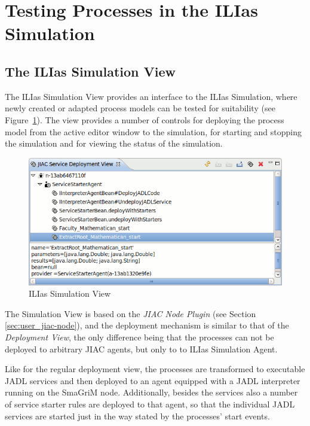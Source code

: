 \section{Testing Processes in the ILIas Simulation}


\subsection{The ILIas Simulation View}

The ILIas Simulation View provides an interface to the ILIas Simulation, where
newly created or adapted process models can be tested for suitability (see
Figure~\ref{fig:ilias-simview}).  The view provides a number of controls for
deploying the process model from the active editor window to the simulation, for
starting and stopping the simulation and for viewing the status of the simulation.

\begin{figure}[ht]
	\centering
	\includegraphics[width=.6\textwidth]{figures/features/deployment-view.png}
	\caption{ILIas Simulation View}
	\label{fig:ilias-simview}
\end{figure}

The Simulation View is based on the \emph{JIAC Node Plugin} (see Section
\ref{sec:user_jiac-node}), and the deployment mechanism is similar to that of the
\emph{Deployment View}, the only difference being that the processes can not be
deployed to arbitrary JIAC agents, but only to to ILIas Simulation Agent.

Like for the regular deployment view, the processes are transformed to executable
JADL services and then deployed to an agent equipped with a JADL interpreter
running on the SmaGriM node.  Additionally, besides the services also a number of
service starter rules are deployed to that agent, so that the individual JADL
services are started just in the way stated by the processes' start events.


